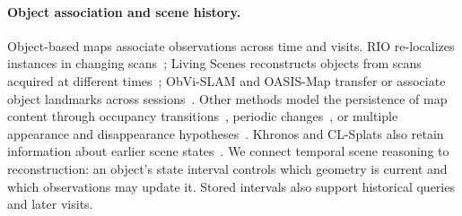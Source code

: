 \paragraph{Object association and scene history.}
Object-based maps associate observations across time and visits. RIO re-localizes instances in changing
scans~\cite{wald2019rio}; Living Scenes reconstructs objects from scans acquired at different
times~\cite{zhu2024livingscenes}; ObVi-SLAM and OASIS-Map transfer or associate object landmarks across
sessions~\cite{adkins2024obvislam,oh2026oasismap}. Other methods model the persistence of map content through
occupancy transitions~\cite{meyerdelius2012changinggrid}, periodic changes~\cite{krajnik2017fremen}, or multiple
appearance and disappearance hypotheses~\cite{saavedraruiz2025perpetua}. Khronos and CL-Splats also retain
information about earlier scene states~\cite{schmid2024khronos,ackermann2025clsplats}.
We connect temporal scene reasoning to reconstruction: an object's state interval controls which geometry is
current and which observations may update it. Stored intervals also support historical queries and later visits.
